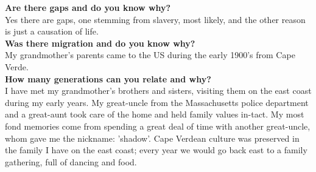 \documentclass{article}
\begin{document}
\begin{minipage}[t]{1.0\linewidth}
\begin{minipage}[t]{0.45\linewidth}
        \textbf{Are there gaps and do you know why?}\vspace{1mm}\\
        Yes there are gaps, one stemming from slavery, most likely, and the other
        reason is just a causation of life.\\

        \textbf{Was there migration and do you know why?}\vspace{1mm}\\
        My grandmother's parents came to the US during the early 1900's from
        Cape Verde.\\

        \textbf{How many generations can you relate and why?}\vspace{1mm}\\
        I have met my grandmother's brothers and sisters, visiting them on the
        east coast during my early years. My great-uncle from the
        Massachusetts police department and a great-aunt took care of the home
        and held family values in-tact. My most fond memories come from spending
        a great deal of time with another great-uncle, whom gave me the nickname:
        'shadow'. Cape Verdean culture was preserved in the family I have on the
        east coast; every year we would go back east to a family gathering, full
        of dancing and food.\\
    \end{minipage}
\end{minipage}
\end{document}
